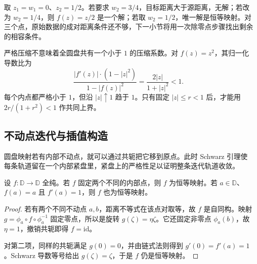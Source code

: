 取 \(z_1=w_1=0\)、\(z_2=1/2\)。若要求 \(w_2=3/4\)，目标距离大于源距离，无解；若改为 \(w_2=1/4\)，则 \(f(z)=z/2\) 是一个解；若取 \(w_2=1/2\)，唯一解是恒等映射。对三个点，原始数据的成对距离条件还不够，下一小节将用一次除零点步骤找出剩余的相容条件。

\ProseParagraphBreak

严格压缩不意味着全圆盘共有一个小于 \(1\) 的压缩系数。对 \(f(z)=z^2\)，其归一化导数比为
\[
 \frac{|f'(z)|\cdot(1-|z|^2)}{1-|f(z)|^2}
 =\frac{2|z|}{1+|z|^2}<1.
\]
每个内点都严格小于 \(1\)，但沿 \(|z|\uparrow1\) 趋于 \(1\)。只有固定 \(|z|\le r<1\) 后，才能用 \(2r/(1+r^2)<1\) 作共同上界。

\subsection{不动点迭代与插值构造}
\label{b3:subsec:060302}

圆盘映射若有内部不动点，就可以通过共轭把它移到原点。此时 Schwarz 引理使每条轨道留在一个内部紧盘里，紧盘上的严格性足以证明整条迭代轨道收敛。

\begin{proposition}[内部不动点的刚性]\label{b3:prop:06-two-fixed-points}
设 \(f:\mathbb D\rightarrow\mathbb D\) 全纯。若 \(f\) 固定两个不同的内部点，则 \(f\) 为恒等映射。若 \(a\in\mathbb D\)、\(f(a)=a\) 且 \(f'(a)=1\)，则 \(f\) 也为恒等映射。
\end{proposition}
\begin{proof}
若有两个不同不动点 \(a,b\)，距离不等式在该点对取等，故 \(f\) 是自同构。映射 \(g=\phi_a\circ f\circ\phi_a^{-1}\) 固定零点，所以是旋转 \(g(\zeta)=\eta\zeta\)。它还固定非零点 \(\phi_a(b)\)，故 \(\eta=1\)，撤销共轭即得 \(f=\mathrm{id}\)。

对第二项，同样的共轭满足 \(g(0)=0\)，并由链式法则得到 \(g'(0)=f'(a)=1\)。Schwarz 导数等号给出 \(g(\zeta)=\zeta\)，于是 \(f\) 仍是恒等映射。
\end{proof}


